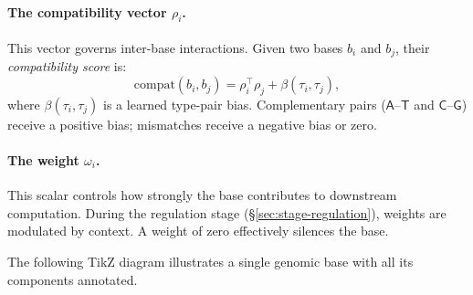 \paragraph{The compatibility vector $\rho_i$.} This vector governs inter-base interactions. Given two bases $b_i$ and $b_j$, their \emph{compatibility score} is:
\begin{equation}
\mathrm{compat}(b_i, b_j) = \rho_i^\top \rho_j + \beta(\tau_i, \tau_j),
\label{eq:compat}
\end{equation}
where $\beta(\tau_i, \tau_j)$ is a learned type-pair bias. Complementary pairs ($\mathsf{A}$--$\mathsf{T}$ and $\mathsf{C}$--$\mathsf{G}$) receive a positive bias; mismatches receive a negative bias or zero.

\paragraph{The weight $\omega_i$.} This scalar controls how strongly the base contributes to downstream computation. During the regulation stage (\S\ref{sec:stage-regulation}), weights are modulated by context. A weight of zero effectively silences the base.

The following TikZ diagram illustrates a single genomic base with all its components annotated.

